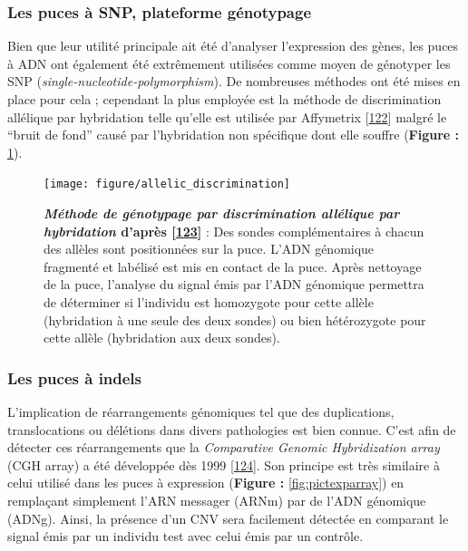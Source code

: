 \documentclass[12pt,a4paper,twoside]{ugathesis}
\theoremstyle{definition}
\theoremstyle{definition}
\theoremstyle{definition}
\theoremstyle{remark}
\begin{document}
\newpage

\subsubsection{Les puces à SNP, plateforme
génotypage}\label{les-puces-a-snp-plateforme-genotypage}

Bien que leur utilité principale ait été d'analyser l'expression des
gènes, les puces à ADN ont également été extrêmement utilisées comme
moyen de génotyper les SNP (\emph{single-nucleotide-polymorphism}). De
nombreuses méthodes ont été mises en place pour cela ; cependant la plus
employée est la méthode de discrimination allélique par hybridation
telle qu'elle est utilisée par Affymetrix
{[}\protect\hyperlink{ref-Wang1998}{122}{]} malgré le ``bruit de fond''
causé par l'hybridation non spécifique dont elle souffre (\textbf{Figure
:} \ref{fig:pictallelicdisc}).

\begin{figure}

{\centering \texttt{[image: figure/allelic\_discrimination]} 

}

\caption[Méthode de génotypage par discrimination allélique par hybridation]{\textbf{\emph{Méthode de génotypage par
discrimination allélique par hybridation} d'après
{[}\protect\hyperlink{ref-Bumgarner2013}{123}{]}} : Des sondes
complémentaires à chacun des allèles sont positionnées sur la puce.
L'ADN génomique fragmenté et labélisé est mis en contact de la puce.
Après nettoyage de la puce, l'analyse du signal émis par l'ADN génomique
permettra de déterminer si l'individu est homozygote pour cette allèle
(hybridation à une seule des deux sondes) ou bien hétérozygote pour
cette allèle (hybridation aux deux sondes).}\label{fig:pictallelicdisc}
\end{figure}











\newpage

\subsubsection{Les puces à indels}\label{les-puces-a-indels}

L'implication de réarrangements génomiques tel que des duplications,
translocations ou délétions dans divers pathologies est bien connue.
C'est afin de détecter ces réarrangements que la \emph{Comparative
Genomic Hybridization array} (CGH array) a été développée dès 1999
{[}\protect\hyperlink{ref-Brown1999}{124}{]}. Son principe est très
similaire à celui utilisé dans les puces à expression (\textbf{Figure :}
\ref{fig:pictexparray}) en remplaçant simplement l'ARN messager (ARNm)
par de l'ADN génomique (ADNg). Ainsi, la présence d'un CNV sera
facilement détectée en comparant le signal émis par un individu test
avec celui émis par un contrôle.
\end{document}
